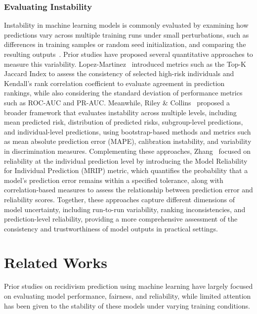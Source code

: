 \documentclass[12pt]{article}
\begin{document}
\subsubsection*{Evaluating Instability} %
\tab%
Instability in machine learning models is commonly evaluated by examining how predictions vary across multiple training runs under small perturbations, such as differences in training samples or random seed initialization, and comparing the resulting outputs~\cite{riley2023stability,lopez2022instability}. Prior studies have proposed several quantitative approaches to measure this variability. Lopez-Martinez~\cite{lopez2022instability} introduced metrics such as the Top-K Jaccard Index to assess the consistency of selected high-risk individuals and Kendall's rank correlation coefficient to evaluate agreement in prediction rankings, while also considering the standard deviation of performance metrics such as ROC-AUC and PR-AUC. Meanwhile, Riley \& Collins~\cite{riley2023stability} proposed a broader framework that evaluates instability across multiple levels, including mean predicted risk, distribution of predicted risks, subgroup-level predictions, and individual-level predictions, using bootstrap-based methods and metrics such as mean absolute prediction error (MAPE), calibration instability, and variability in discrimination measures. Complementing these approaches, Zhang~\cite{zhang2024reliability} focused on reliability at the individual prediction level by introducing the Model Reliability for Individual Prediction (MRIP) metric, which quantifies the probability that a model's prediction error remains within a specified tolerance, along with correlation-based measures to assess the relationship between prediction error and reliability scores. Together, these approaches capture different dimensions of model uncertainty, including run-to-run variability, ranking inconsistencies, and prediction-level reliability, providing a more comprehensive assessment of the consistency and trustworthiness of model outputs in practical settings.

\section{Related Works}
\tab%
Prior studies on recidivism prediction using machine learning have largely focused on evaluating model performance, fairness, and reliability, while limited attention has been given to the stability of these models under varying training conditions.
\end{document}
